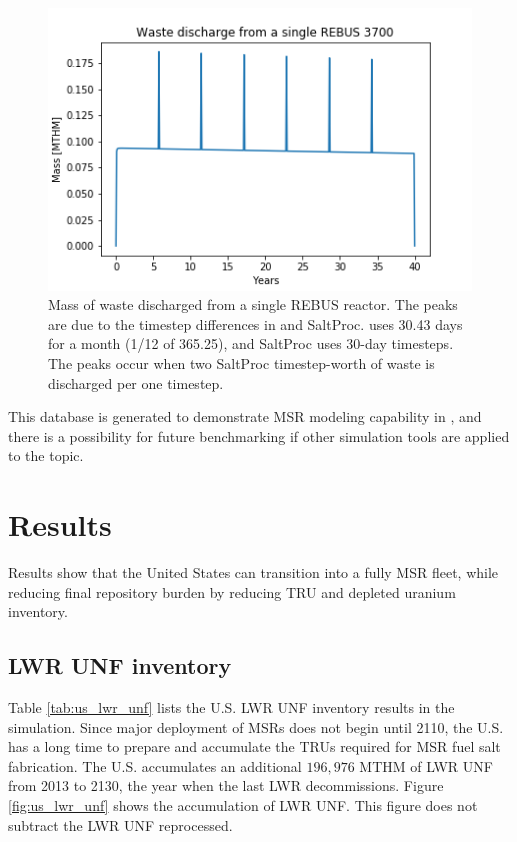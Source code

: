 \begin{figure}[htbp!]
	\begin{center}
		\includegraphics[scale=0.7]{./images/us/rebus_waste.png}
	\end{center}
	\caption{Mass of waste discharged from a single REBUS reactor. The peaks
		are due to the timestep differences in \Cyclus and SaltProc. \Cyclus
		uses 30.43 days for a month (1/12 of 365.25), and SaltProc uses 30-day
		timesteps. The peaks occur when two SaltProc timestep-worth of waste is discharged
		per one \Cyclus timestep.
	}
	\label{fig:rebus_waste}
\end{figure}

This database is generated to demonstrate \gls{MSR} modeling capability in \Cyclus,
and there is a possibility for future benchmarking if other simulation tools are
applied to the topic.


\FloatBarrier


\section{Results}
Results show that the United States can transition into a
fully \gls{MSR} fleet, while reducing final repository
burden by reducing \gls{TRU} and depleted uranium
inventory.

\subsection{\gls{LWR} \gls{UNF} inventory}

Table \ref{tab:us_lwr_unf} lists the U.S. \gls{LWR} \gls{UNF} inventory
results in the simulation.
Since major deployment of \glspl{MSR} does not begin until 2110,
the U.S. has a long time to prepare and accumulate the \glspl{TRU}
required for \gls{MSR} fuel salt fabrication. The U.S. accumulates
an additional $196,976$ \gls{MTHM} of \gls{LWR} \gls{UNF}
from 2013 to 2130, the year when the last \gls{LWR} decommissions.
Figure \ref{fig:us_lwr_unf} shows the accumulation of \gls{LWR} \gls{UNF}.
This figure does not subtract the \gls{LWR} \gls{UNF} reprocessed.



